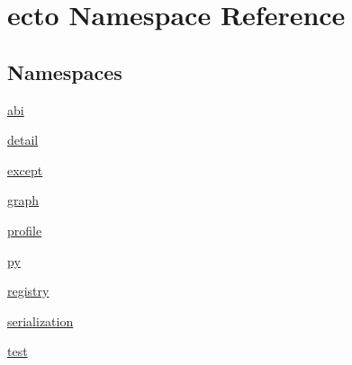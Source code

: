 \hypertarget{namespaceecto}{\section{ecto Namespace Reference}
\label{namespaceecto}
}
\subsection*{Namespaces}
\begin{DoxyCompactItemize}
\item 
\hyperlink{namespaceecto_1_1abi}{abi}
\item 
\hyperlink{namespaceecto_1_1detail}{detail}
\item 
\hyperlink{namespaceecto_1_1except}{except}
\item 
\hyperlink{namespaceecto_1_1graph}{graph}
\item 
\hyperlink{namespaceecto_1_1profile}{profile}
\item 
\hyperlink{namespaceecto_1_1py}{py}
\item 
\hyperlink{namespaceecto_1_1registry}{registry}
\item 
\hyperlink{namespaceecto_1_1serialization}{serialization}
\item 
\hyperlink{namespaceecto_1_1test}{test}
\end{DoxyCompactItemize}
